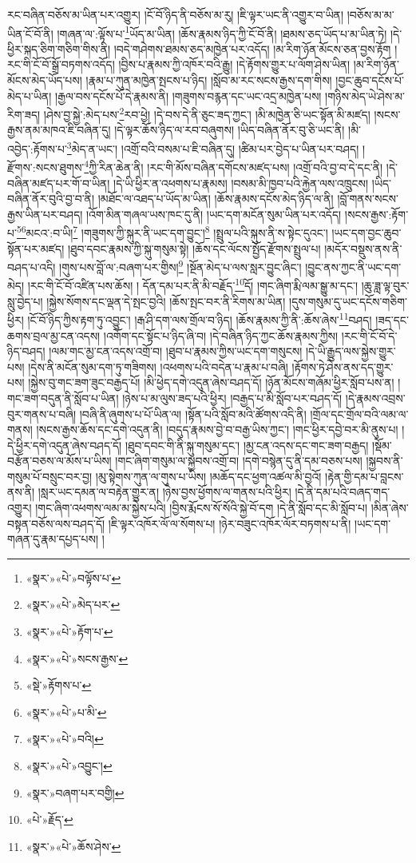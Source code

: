 རང་བཞིན་བཅོས་མ་ཡིན་པར་འགྱུར། །ངོ་བོ་ཉིད་ནི་བཅོས་མ་རུ། །ཇི་ལྟར་ཡང་ནི་འགྱུར་བ་ཡིན། །བཅོས་མ་མ་ཡིན་ངོ་བོ་ནི། །གཞན་ལ་:ལྟོས་པ་\footnote{«སྣར་»«པེ་»བལྟོས་པ་}ཡོད་མ་ཡིན། །ཆོས་རྣམས་ཉིད་ཀྱི་ངོ་བོ་ནི། །ཐམས་ཅད་ཡོད་པ་མ་ཡིན་ཏེ། །དེ་ཕྱིར་སྐད་ཅིག་གཅིག་གིས་ནི། །བདེ་གཤེགས་ཐམས་ཅད་མཁྱེན་པར་འདོད། །མ་རིག་ཉོན་མོངས་ཅན་བྱས་རྟོག །རང་གི་ངོ་བོ་སྒྲོ་བཏགས་འདོད། །བྱིས་པ་རྣམས་ཀྱི་འཁོར་བའི་རྒྱུ། །དེ་རྟོགས་གྱུར་པ་ལོག་ཤེས་ཡིན། །མ་རིག་ཉོན་མོངས་མེད་ཡོད་པས། །རྣམ་པ་ཀུན་མཁྱེན་སྤངས་པ་ཉིད། །སློབ་མ་རང་སངས་རྒྱས་དག་གིས། །བྱང་ཆུབ་དངོས་པོ་མེད་པ་ཡིན། །རྒྱལ་བས་དངོས་པོ་དེ་རྣམས་ནི། །གཟུགས་བརྙན་དང་ཡང་འདྲ་མཁྱེན་པས། །གཉིས་མེད་ཡེ་ཤེས་མ་རིག་ཟད། །ཤེས་བྱ་སྐྱེ་:མེད་པས་\footnote{«སྣར་»«པེ་»མེད་པར་}རབ་ཕྱེ། །དེ་བས་དེ་ནི་ཅུང་ཟད་ཀྱང་། །མི་མཁྱེན་ཅི་ཡང་སྟོན་མི་མཛད། །སངས་རྒྱས་ནམ་མཁའ་ཇི་བཞིན་དུ། །དེ་ལྟར་ཆོས་ཉིད་ལ་རབ་བཞུགས། །ཡིད་བཞིན་ནོར་བུ་ཅི་ཡང་ནི། །མི་འབྱེད་:རྟོགས་པ་\footnote{«སྣར་»«པེ་»རྟོག་པ་}མེད་ན་ཡང་། །འགྲོ་བའི་བསམ་པ་ཇི་བཞིན་དུ། །ཚིམ་པར་བྱེད་པ་ཡིན་པར་བཤད། །རྫོགས་:སངས་ཐུགས་\footnote{«སྣར་»«པེ་»སངས་རྒྱས་}ཀྱི་རིན་ཆེན་ནི། །རང་གི་མོས་བཞིན་དགོངས་མཛད་པས། །འགྲོ་བའི་བྱ་བ་དེ་དང་ནི། །དེ་བཞིན་མཛད་པར་གོ་བ་ཡིན། །དེ་ཡི་ཕྱིར་ན་འཕགས་པ་རྣམས། །བསམ་མི་ཁྱབ་པའི་རྐྱེན་ལས་འཁྲུངས། །ཡིད་བཞིན་ནོར་བུའི་བྱ་བ་ནི། །མཐོང་ལ་འཐད་པ་ཡོད་མ་ཡིན། །ཆོས་རྣམས་དངོས་མེད་ཉིད་ལ་ནི། །བློ་གནས་སངས་རྒྱས་ཡིན་པར་བཤད། །འོག་མིན་གཞལ་ཡས་ཁང་དུ་ནི། །ཡང་དག་མངོན་སུམ་ཡིན་པར་འདོད། །སངས་རྒྱས་:རྟོག་པ་\footnote{«སྡེ་»རྟོགས་པ་}\footnote{«སྣར་»«པེ་»པ་མི་}མངའ་:བ་ཡི།\footnote{«སྣར་»«པེ་»བའི།} །གཟུགས་ཀྱི་སྐུར་ནི་ཡང་དག་བྱུང་།\footnote{«སྣར་»«པེ་»འབྱུང་།} །སྤྲུལ་པའི་སྐུས་ནི་ས་སྟེང་དུའང་། །ཡང་དག་བྱང་ཆུབ་སྟོན་པར་མཛད། །ཐུབ་དབང་རྣམས་ཀྱི་སྐུ་གསུམ་སྟེ། །ཆོས་དང་ལོངས་སྤྱོད་རྫོགས་སྤྲུལ་པ། །མདོར་བསྡུས་ནས་ནི་བཤད་པ་འདི། །གུས་པས་བློ་ལ་:བཞག་པར་གྱིས།\footnote{«སྣར་»བཞག་པར་བགྱི།} །སྔོན་མེད་པ་ལས་སླར་བྱུང་ཞིང་། །བྱུང་ནས་ཀྱང་ནི་ཡང་དག་མེད། །རང་གི་ངོ་བོ་འཛིན་པས་ཆོས། །
དོན་དམ་པར་ནི་མི་བརྗོད་\footnote{«པེ་»རྗོད་}དོ། །གང་ཞིག་རྨི་ལམ་སྒྱུ་མ་དང་། །ཆུ་ཟླ་ལྟ་བུར་སླུ་བྱེད་པ། །སྐྱེས་སོགས་དང་ལྡན་དེ་སྤང་བྱའི། །ཆོས་སྤང་བར་ནི་རིགས་མ་ཡིན། །དུས་གསུམ་དུ་ཡང་དངོས་གཅིག་ཕྱིར། །ངོ་བོ་ཉིད་ཀྱིས་རྟག་ཏུ་འབྱུང་། །རྒ་ཤི་དག་ལས་གྲོལ་བ་ཉིད། །ཆོས་རྣམས་ཀྱི་ནི་:ཆོས་ཞེས་\footnote{«སྣར་»«པེ་»ཆོས་ཤེས་}བཤད། །ཟད་དང་ཆགས་བྲལ་མྱ་ངན་འདས། །འགོག་དང་སྟོང་པ་ཉིད་ཞི་བ། །དེ་བཞིན་ཉིད་ཀྱང་ཆོས་རྣམས་ཀྱིས། །རང་གི་ངོ་བོ་དེ་ཉིད་བཤད། །ལམ་གང་མྱ་ངན་འདས་འགྲོ་བ། །ཐུབ་པ་རྣམས་ཀྱིས་ཡང་དག་གསུངས། །དེ་ཡི་རྒྱུད་ལས་སྐྱེས་གྱུར་པས། །དེས་ནི་མངོན་སུམ་དག་ཏུ་གཟིགས། །འཕགས་པའི་བདེན་པ་རྣམ་པ་བཞི། །རྟོགས་ཏེ་ཤེས་ནས་དད་གྱུར་པས། །སྐྱེས་བུ་གང་ཟག་ཟུང་བརྒྱད་པོ། །མི་ཕྱེད་དགེ་འདུན་ཞེས་བཤད་དོ། །ཉོན་མོངས་གཞོམ་ཕྱིར་སློབ་པས་ན། །གང་ཟག་བདུན་ནི་སློབ་པ་ཡིན། །ཉེས་པ་མ་ལུས་ཟད་པའི་ཕྱིར། །བརྒྱད་པ་མི་སློབ་པར་བཤད་དོ། །དེ་རྣམས་འབྲས་བུར་གནས་པ་བཞི། །བཞི་ནི་ཞུགས་པ་པོ་ཡིན་ལ། །སྟོན་པའི་སློབ་མའི་ཚོགས་འདི་ནི། །གྲོལ་དང་གྲོལ་བའི་ལམ་ལ་གནས། །སངས་རྒྱས་ཆོས་དང་དགེ་འདུན་ནི། །བདུད་རྣམས་བྱེ་བ་བརྒྱ་ཡིས་ཀྱང་། །གང་ཕྱིར་དབྱེ་བར་མི་ནུས་པ། །དེ་ཕྱིར་དགེ་འདུན་ཞེས་བཤད་དོ། །ཐུབ་དབང་གི་ནི་སྐུ་གསུམ་དང་། །མྱ་ངན་འདས་དང་གང་ཟག་བརྒྱད། །སྡོམ་བརྩོན་བཅས་ལ་མོས་པ་ཡིས། །གང་ཞིག་གསུམ་ལ་སྐྱབས་འགྲོ་བ། །དགེ་བསྙེན་དུ་ནི་དམ་བཅས་པས། །སྐྱབས་ནི་གསུམ་པོ་བསྲུང་བར་བྱ། །མུ་སྟེགས་ཀུན་ལ་གུས་པ་ཡིས། །མཆོད་དང་ཕྱག་འཚལ་མི་བྱའོ། །རྟེན་གྱི་དམ་པ་བླངས་ནས་ནི། །སླར་ཡང་དམན་ལ་བརྟེན་གྱུར་ན། །ཉེས་བྱས་ཕྱོགས་ལ་གནས་པའི་ཕྱིར། །དེ་ནི་དམ་པའི་བཞད་གད་འགྱུར། །གང་ཞིག་འཕགས་ལམ་མ་སྐྱེས་པའི། །བྱིས་རྨོངས་སོ་སོའི་སྐྱེ་བོ་དག །དེ་ནི་སློབ་དང་མི་སློབ་པ། །མིན་ཞེས་བསྟན་བཅོས་ལས་བཤད་དོ། །ཇི་ལྟར་འཁོར་ལོ་ལ་སོགས་པ། །ཉེར་བཟུང་འཁོར་ལོར་བཏགས་པ་ནི། །ཡང་དག་གཞན་དུ་རྣམ་དཔྱད་པས། །
